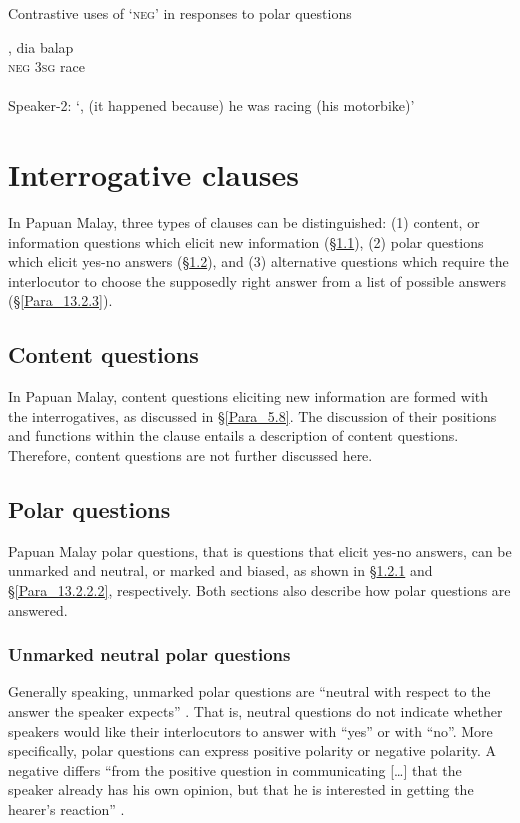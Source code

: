 \begin{styleExampleTitle}
Contrastive uses of  ‘\textsc{neg}’ in responses to polar questions
\end{styleExampleTitle}

\ea
\label{Example_13.23}
 {,} {dia} {balap}\\ %
{}   \textsc{neg}  \textsc{3sg}  race\\
\\
Speaker-2: ‘, (it happened because) he was racing (his motorbike)’ \textstyleExampleSource{[Elicited MY131126.001]}
\z

\section{Interrogative clauses}
\label{Para_13.2}
In Papuan Malay, three types of  clauses can be distinguished: (1) content, or information questions which elicit new information (§\ref{Para_13.2.1}), (2) polar questions which elicit yes-no answers (§\ref{Para_13.2.2}), and (3) alternative questions which require the interlocutor to choose the supposedly right answer from a list of possible answers (§\ref{Para_13.2.3}).


\subsection{Content questions}
\label{Para_13.2.1}
In Papuan Malay, content questions eliciting new information are formed with the interrogatives, as discussed in §\ref{Para_5.8}. The discussion of their positions and functions within the clause entails a description of content questions. Therefore, content questions are not further discussed here.


\subsection{Polar questions}
\label{Para_13.2.2}
Papuan Malay polar questions, that is questions that elicit yes-no answers, can be unmarked and neutral, or marked and biased, as shown in §\ref{Para_13.2.2.1} and §\ref{Para_13.2.2.2}, respectively. Both sections also describe how polar questions are answered.


\subsubsection[Unmarked neutral polar questions]{Unmarked neutral polar questions}
\label{Para_13.2.2.1}
Generally speaking, unmarked polar questions are “neutral with respect to the answer the speaker expects” \citep[179]{Sadock.1985}. That is, neutral questions do not indicate whether speakers would like their interlocutors to answer with ``yes'' or with ``no''. More specifically, polar questions can express positive polarity or negative polarity. A negative  differs “from the positive question in communicating [\ldots] that the speaker already has his own opinion, but that he is interested in getting the hearer’s reaction” \citep[67]{Grimes.1975}.



